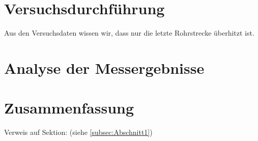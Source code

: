 \chapter{Versuchsdurchführung}
\label{cha:Versuchsdurchführung}

Aus den Versuchsdaten wissen wir, dass nur die letzte Rohrstrecke überhitzt ist.

\chapter{Analyse der Messergebnisse}
\label{cha:Analyse der Messergebnisse}

\chapter{Zusammenfassung}
\label{cha:Zusammenfassung}
Verweis auf Sektion: (siehe \ref{subsec:Abschnitt1})